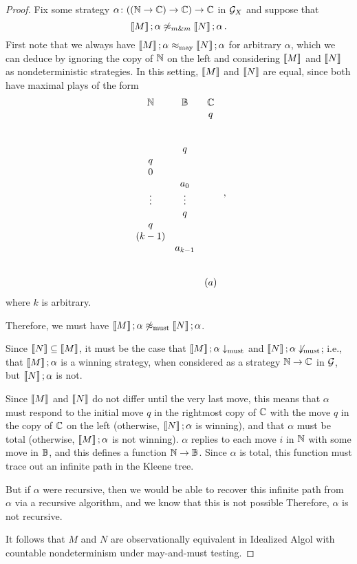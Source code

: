 \begin{proof}
  Fix some strategy $\alpha\colon ((\mathbb{N} \to \mathbb{C})\to\mathbb{C}) \to \mathbb{C}$ in $\mathcal G_X$ and suppose that
  \[
    \left\llbracket M\right\rrbracket;\alpha\not\mathrel{\approx_{m\&m}} \left\llbracket N\right\rrbracket;\alpha\,.
    \]
  First note that we always have $\left\llbracket M\right\rrbracket;\alpha\approx_{\operatorname{may}}\left\llbracket N\right\rrbracket;\alpha$ for arbitrary $\alpha$, which we can deduce by ignoring the copy of $\mathbb{N}$ on the left and considering $\left\llbracket M\right\rrbracket$ and $\left\llbracket N\right\rrbracket$ as nondeterministic strategies.  
  In this setting, $\left\llbracket M\right\rrbracket$ and $\left\llbracket N\right\rrbracket$ are equal, since both have maximal plays of the form
  \[
    \begin{array}{ccc}
       \mathbb{N} & \mathbb{B} & \mathbb{C} \\
           &     &  q  \\
           &     &     \\
           &     &     \\
           &  q  &     \\
        q  &     &     \\
        0  &     &     \\
           & a_0 &     \\
     \vdots&\vdots&   \\
           &  q  &     \\
        q  &     &     \\
      (k-1)&     &     \\
           &a_{k-1}&   \\
           &     &     \\
           &     &     \\
           &     & (a)
    \end{array}\,,
    \]
  where $k$ is arbitrary.  

  Therefore, we must have $\left\llbracket M\right\rrbracket;\alpha \not\approx_{\operatorname{must}}\left\llbracket N\right\rrbracket;\alpha$.

  Since $\left\llbracket N\right\rrbracket \subseteq \left\llbracket M\right\rrbracket$, it must be the case that $\left\llbracket M\right\rrbracket;\alpha\downarrow_{\operatorname{must}}$ and $\left\llbracket N\right\rrbracket;\alpha\not\downarrow_{\operatorname{must}}$; i.e., that $\left\llbracket M\right\rrbracket;\alpha$ is a winning strategy, when considered as a strategy $\mathbb{N} \to \mathbb{C}$ in $\mathcal G$, but $\left\llbracket N\right\rrbracket;\alpha$ is not.

  Since $\left\llbracket M\right\rrbracket$ and $\left\llbracket N\right\rrbracket$ do not differ until the very last move, this means that $\alpha$ must respond to the initial move $q$ in the rightmost copy of $\mathbb{C}$ with the move $q$ in the copy of $\mathbb{C}$ on the left (otherwise, $\left\llbracket N\right\rrbracket;\alpha$ is winning), and that $\alpha$ must be total (otherwise, $\left\llbracket M\right\rrbracket;\alpha$ is not winning).
  $\alpha$ replies to each move $i$ in $\mathbb{N}$ with some move in $\mathbb{B}$, and this defines a function $\mathbb{N} \to \mathbb{B}$.  
  Since $\alpha$ is total, this function must trace out an infinite path in the Kleene tree.

  But if $\alpha$ were recursive, then we would be able to recover this infinite path from $\alpha$ via a recursive algorithm, and we know that this is not possible
  Therefore, $\alpha$ is not recursive.  

  It follows that $M$ and $N$ are observationally equivalent in Idealized Algol with countable nondeterminism under may-and-must testing.
\end{proof}

